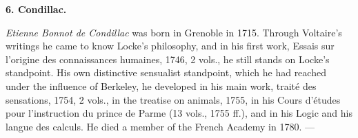 \divrule

\begin{center}
  \textbf{6. Condillac.}
\end{center}

\emph{Etienne Bonnot de Condillac} was born in Grenoble in 1715. Through
Voltaire's writings he came to know Locke's philosophy, and in his first
work, Essais sur l'origine des connaissances humaines, 1746, 2 vols.,
he still stands on Locke's standpoint. His own distinctive sensualist
standpoint, which he had reached under the influence of Berkeley, he
developed in his main work, traité des sensations, 1754, 2 vols., in
the treatise on animals, 1755, in his Cours d'études pour l'instruction
du prince de Parme (13 vols., 1755 ff.), and in his Logic and his
langue des calculs. He died a member of the French Academy in 1780. ---

